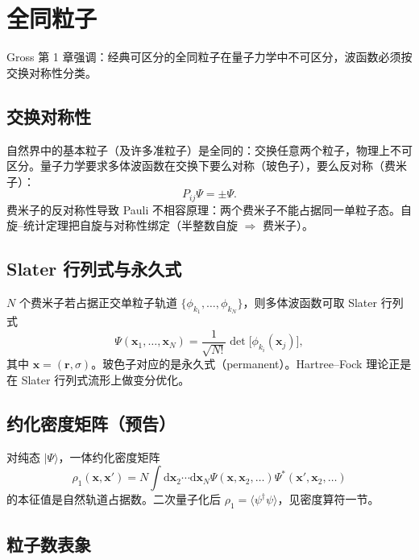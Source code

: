 \section{全同粒子}

Gross 第 1 章强调：经典可区分的全同粒子在量子力学中不可区分，波函数必须按交换对称性分类。

\subsection{交换对称性}

自然界中的基本粒子（及许多准粒子）是全同的：交换任意两个粒子，物理上不可区分。量子力学要求多体波函数在交换下要么对称（玻色子），要么反对称（费米子）：
\begin{equation}
  P_{ij}\Psi=\pm\Psi.
\end{equation}
费米子的反对称性导致 Pauli 不相容原理：两个费米子不能占据同一单粒子态。自旋--统计定理把自旋与对称性绑定（半整数自旋 $\Rightarrow$ 费米子）。

\subsection{Slater 行列式与永久式}

$N$ 个费米子若占据正交单粒子轨道 $\{\phi_{k_1},\ldots,\phi_{k_N}\}$，则多体波函数可取 Slater 行列式
\begin{equation}
  \Psi(\mathbf{x}_1,\ldots,\mathbf{x}_N)
  =\frac{1}{\sqrt{N!}}
  \det\bigl[\phi_{k_i}(\mathbf{x}_j)\bigr],
\end{equation}
其中 $\mathbf{x}=(\mathbf{r},\sigma)$。玻色子对应的是永久式（permanent）。Hartree--Fock 理论正是在 Slater 行列式流形上做变分优化。

\subsection{约化密度矩阵（预告）}

对纯态 $|\Psi\rangle$，一体约化密度矩阵
\begin{equation}
  \rho_1(\mathbf{x},\mathbf{x}')
  =N\int\mathrm{d}\mathbf{x}_2\cdots\mathrm{d}\mathbf{x}_N
  \Psi(\mathbf{x},\mathbf{x}_2,\ldots)
  \Psi^*(\mathbf{x}',\mathbf{x}_2,\ldots)
\end{equation}
的本征值是自然轨道占据数。二次量子化后 $\rho_1=\langle\psi^\dagger\psi\rangle$，见密度算符一节。

\subsection{粒子数表象}

